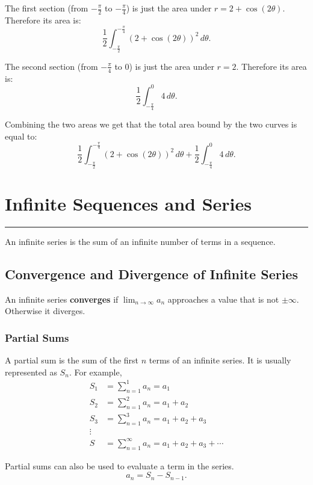 \documentclass[12pt]{article}
\newcommand{\fline}{\par\noindent\rule{\textwidth}{0.1pt}} %
\begin{document}
\begin{enumerate}
          The first section (from $-\frac{\pi}{2}$ to $-\frac{\pi}{4}$) is just the area under $r=2+\cos(2\theta)$. Therefore its area is:
          \[ \frac{1}{2} \int_{-\frac{\pi}{2}}^{-\frac{\pi}{4}} \left( 2+\cos(2\theta) \right)^2 \, d\theta. \]

          The second section (from $-\frac{\pi}{4}$ to $0$) is just the area under $r=2$. Therefore its area is:
          \[ \frac{1}{2} \int_{-\frac{\pi}{4}}^0 4 \, d\theta. \]

          Combining the two areas we get that the total area bound by the two curves is equal to:
          \[ \frac{1}{2} \int_{-\frac{\pi}{2}}^{-\frac{\pi}{4}} \left( 2+\cos(2\theta) \right)^2 \, d\theta + \frac{1}{2} \int_{-\frac{\pi}{4}}^0 4 \, d\theta. \]
\end{enumerate}

\section{Infinite Sequences and Series}
\fline

\noindent An infinite series is the sum of an infinite number of terms in a sequence.

\subsection{Convergence and Divergence of Infinite Series}
An infinite series \textbf{converges} if $\displaystyle \lim_{n \to \infty} a_n$ approaches a value that is not $\pm \infty$. Otherwise it diverges.

\subsubsection{Partial Sums}
A partial sum is the sum of the first $n$ terms of an infinite series. It is usually represented as $S_n$. For example,
\begin{align*}
    S_1 & = \sum_{n=1}^1 a_n = a_1                           \\
    S_2 & = \sum_{n=1}^2 a_n = a_1 + a_2                     \\
    S_3 & = \sum_{n=1}^3 a_n = a_1 + a_2 + a_3               \\
    \vdots                                                   \\
    S   & = \sum_{n=1}^\infty a_n = a_1 + a_2 + a_3 + \cdots
\end{align*}

\noindent Partial sums can also be used to evaluate a term in the series.
\[ a_n = S_n - S_{n-1}. \]
\end{document}
